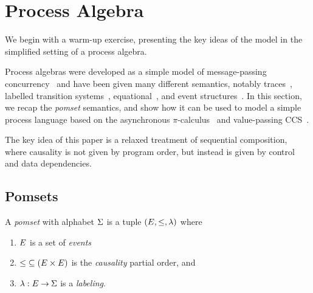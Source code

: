 \section{Process Algebra}

We begin with a warm-up exercise, presenting the key ideas of the
model in the simplified setting of a process algebra.

Process algebras were developed as a simple model of message-passing
concurrency~\cite{CCS,CSP,ACP} and have been given many different
semantics, notably traces~\cite{???}, labelled transition
systems~\cite{???}, equational~\cite{???}, and event
structures~\cite{???}.  In this section, we recap the \emph{pomset}
semantics, and show how it can be used to model a simple process
language based on the asynchronous $\pi$-calculus~\cite{???} and
value-passing CCS~\cite{???}.

The key idea of this paper is a relaxed treatment of sequential
composition, where causality is not given by program order, but
instead is given by control and data dependencies.

\subsection{Pomsets}

\begin{definition}
  A \emph{pomset} with alphabet $\Sigma$ is a tuple
  $(E, {\le}, \lambda)$ where
  \begin{enumerate}
  \item $E$ is a set of \emph{events}
  \item
    ${\le} \subseteq (E\times E)$ is the \emph{causality} partial order, and
  \item
    $\lambda: E \mathbin\rightarrow \Sigma$ is a \emph{labeling}.
  \end{enumerate}
\end{definition}

